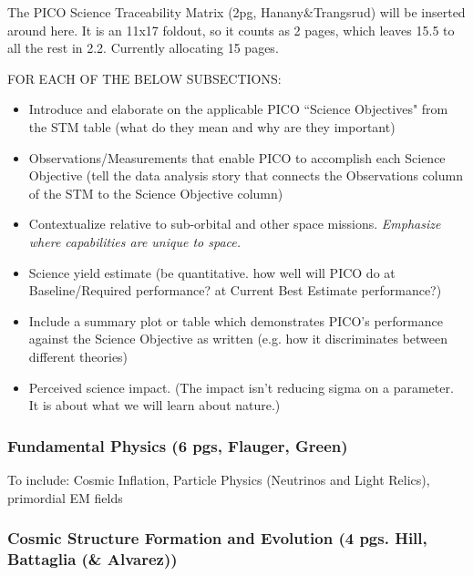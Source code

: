 \documentclass[12pt]{article}
\begin{document}
  The PICO Science Traceability Matrix (2pg, Hanany\&Trangsrud) will be inserted around here.  It is an 11x17 foldout, so it counts as 2 pages, which leaves 15.5 to all the rest in 2.2. Currently allocating 15 pages.  
    
    \vspace{12pt}
     FOR EACH OF THE BELOW SUBSECTIONS:
    \begin{itemize}
    \item Introduce and elaborate on the applicable PICO ``Science Objectives" from the STM table (what do they mean and why are they important)
    \item Observations/Measurements that enable PICO to accomplish each Science Objective (tell the data analysis story that connects the Observations column of the STM to the Science Objective column)
    \item Contextualize relative to sub-orbital and other space missions. {\it Emphasize where capabilities are unique to space.}
    \item Science yield estimate (be quantitative. how well will PICO do at Baseline/Required performance? at Current Best Estimate performance?)
    \item Include a summary plot or table which demonstrates PICO's performance against the Science Objective as written (e.g. how it discriminates between different theories) 
    \item Perceived science impact. (The impact isn't reducing sigma on a parameter.  It is about what we will learn about nature.)
    \end{itemize}


\subsubsection{Fundamental Physics (6 pgs, Flauger, Green)}

To include: Cosmic Inflation, Particle Physics (Neutrinos and Light Relics), primordial EM fields




\subsubsection{Cosmic Structure Formation and Evolution (4 pgs. Hill, Battaglia (\& Alvarez))}



\end{document}
